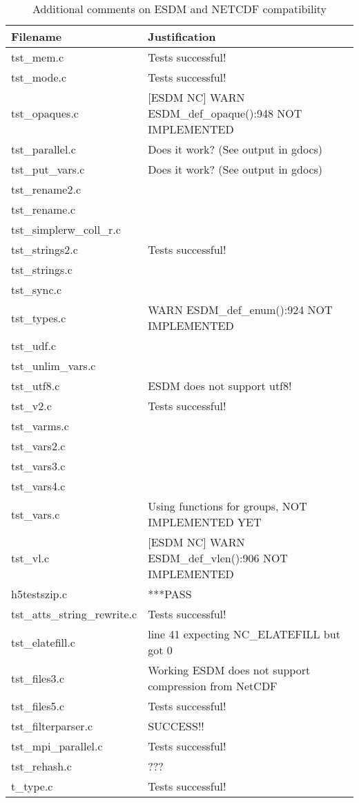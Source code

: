 \begin{table}[H]
\centering
\begin{tabular}{|l|l|}
\hline
Filename & Justification \\ \hline \hline
tst\_mem.c   &    Tests successful!   \\ \hline
tst\_mode.c   &   Tests successful!    \\ \hline
tst\_opaques.c   &  [ESDM NC] WARN ESDM\_def\_opaque():948 NOT IMPLEMENTED     \\ \hline
tst\_parallel.c   &   Does it work? (See output in gdocs)    \\ \hline
tst\_put\_vars.c   &   Does it work? (See output in gdocs)    \\ \hline
tst\_rename2.c   &       \\ \hline
tst\_rename.c   &       \\ \hline
tst\_simplerw\_coll\_r.c   &       \\ \hline
tst\_strings2.c   &   Tests successful!    \\ \hline
tst\_strings.c   &       \\ \hline
tst\_sync.c   &       \\ \hline
tst\_types.c   &  WARN ESDM\_def\_enum():924 NOT IMPLEMENTED     \\ \hline
tst\_udf.c   &       \\ \hline
tst\_unlim\_vars.c   &       \\ \hline
tst\_utf8.c   &   ESDM does not support utf8!  \\ \hline
tst\_v2.c   &    Tests successful!   \\ \hline
tst\_varms.c   &       \\ \hline
tst\_vars2.c   &       \\ \hline
tst\_vars3.c   &       \\ \hline
tst\_vars4.c   &       \\ \hline
tst\_vars.c   &    Using functions for groups, NOT IMPLEMENTED YET   \\ \hline
tst\_vl.c   &   [ESDM NC] WARN ESDM\_def\_vlen():906 NOT IMPLEMENTED    \\ \hline
h5testszip.c   & ***PASS   \\ \hline
tst\_atts\_string\_rewrite.c   & Tests successful!  \\ \hline
tst\_elatefill.c   & line 41 expecting NC\_ELATEFILL but got 0   \\ \hline
tst\_files3.c   & Working ESDM does not support compression from NetCDF   \\ \hline
tst\_files5.c   & Tests successful!  \\ \hline
tst\_filterparser.c   & SUCCESS!!   \\ \hline
tst\_mpi\_parallel.c   & Tests successful!   \\ \hline
tst\_rehash.c   & ???   \\ \hline
t\_type.c   & Tests successful!   \\ \hline
\hline
\end{tabular}
\caption{Additional comments on ESDM and NETCDF compatibility}
\end{table}


